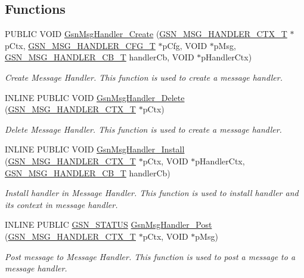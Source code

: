 \subsection*{Functions}
\begin{DoxyCompactItemize}
\item 
PUBLIC VOID \hyperlink{a00627_gacc70d680d0d460b942143107dca09514}{GsnMsgHandler\_\-Create} (\hyperlink{a00155}{GSN\_\-MSG\_\-HANDLER\_\-CTX\_\-T} $\ast$pCtx, \hyperlink{a00154}{GSN\_\-MSG\_\-HANDLER\_\-CFG\_\-T} $\ast$pCfg, VOID $\ast$pMsg, \hyperlink{a00627_ga638c4ec452bde3b70fae3b7239e05cca}{GSN\_\-MSG\_\-HANDLER\_\-CB\_\-T} handlerCb, VOID $\ast$pHandlerCtx)
\begin{DoxyCompactList}\small\item\em Create Message Handler. This function is used to create a message handler. \end{DoxyCompactList}\item 
INLINE PUBLIC VOID \hyperlink{a00627_gaf9aa1fcf54621e2f9cc80cd0c8697d70}{GsnMsgHandler\_\-Delete} (\hyperlink{a00155}{GSN\_\-MSG\_\-HANDLER\_\-CTX\_\-T} $\ast$pCtx)
\begin{DoxyCompactList}\small\item\em Delete Message Handler. This function is used to create a message handler. \end{DoxyCompactList}\item 
INLINE PUBLIC VOID \hyperlink{a00627_ga1658d3ee7bb4baeaccbfb3350b834674}{GsnMsgHandler\_\-Install} (\hyperlink{a00155}{GSN\_\-MSG\_\-HANDLER\_\-CTX\_\-T} $\ast$pCtx, VOID $\ast$pHandlerCtx, \hyperlink{a00627_ga638c4ec452bde3b70fae3b7239e05cca}{GSN\_\-MSG\_\-HANDLER\_\-CB\_\-T} handlerCb)
\begin{DoxyCompactList}\small\item\em Install handler in Message Handler. This function is used to install handler and its context in message handler. \end{DoxyCompactList}\item 
INLINE PUBLIC \hyperlink{a00660_gada5951904ac6110b1fa95e51a9ddc217}{GSN\_\-STATUS} \hyperlink{a00627_gae27cb95242e79adb4d3ed617f0126c4b}{GsnMsgHandler\_\-Post} (\hyperlink{a00155}{GSN\_\-MSG\_\-HANDLER\_\-CTX\_\-T} $\ast$pCtx, VOID $\ast$pMsg)
\begin{DoxyCompactList}\small\item\em Post message to Message Handler. This function is used to post a message to a message handler. \end{DoxyCompactList}\end{DoxyCompactItemize}


